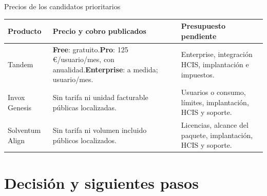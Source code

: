 \documentclass[aspectratio=169,10pt]{beamer}
\begin{document}
\begin{frame}[t]{Precios de los candidatos prioritarios}
\small
\begin{tabularx}{\textwidth}{L{.16\textwidth}L{.40\textwidth}X}
\toprule
Producto & Precio y cobro publicados & Presupuesto pendiente \\
\midrule
Tandem & \textbf{Free}: gratuito.\newline \textbf{Pro}: 125 €/usuario/mes, con anualidad.\newline \textbf{Enterprise}: a medida; usuario/mes. & Enterprise, integración HCIS, implantación e impuestos. \\
Invox Genesis & Sin tarifa ni unidad facturable públicas localizadas. & Usuarios o consumo, límites, implantación, HCIS y soporte. \\
Solventum Align & Sin tarifa ni volumen incluido públicos localizados. & Licencias, alcance del paquete, implantación, HCIS y soporte. \\
\bottomrule
\end{tabularx}
\end{frame}

\section{Decisión y siguientes pasos}
\end{document}
